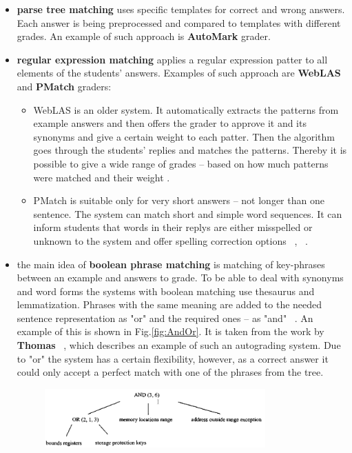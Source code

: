 \documentclass[11pt]{report}
\numberwithin{equation}{section} %
\begin{document}
\begin{itemize}
\item \textbf{parse tree matching} uses specific templates for correct and wrong answers. Each answer is being preprocessed and compared to templates with different grades. An example of such approach is \textbf{AutoMark} grader.
\item \textbf{regular expression matching} applies a regular expression patter to all elements of the students' answers. Examples of such approach are \textbf{WebLAS} and \textbf{PMatch} graders:
\begin{itemize}
\item  WebLAS is an older system. It automatically extracts the patterns from example answers and then offers the grader to approve it and its synonyms and give a certain weight to each patter. Then the algorithm goes through the students' replies and matches the patterns. Thereby it is possible to give a wide range of grades -- based on how much patterns were matched and their weight \cite{Burrows}. 
\item PMatch is suitable only for very short answers -- not longer than one sentence. The system can match short and simple word sequences. It can inform students that words in their replys are either misspelled or unknown to the system and offer spelling correction options ~\cite{Hasanah}, ~\cite{Burrows}.
\end{itemize}
\item the main idea of \textbf{boolean phrase matching} is matching of key-phrases between an example and answers to grade. To be able to deal with synonyms and word forms the systems with boolean matching use thesaurus and lemmatization. Phrases with the same meaning are added to the needed sentence representation as "or" and the required ones -- as "and" ~\cite{Hasanah}. An example of this is shown in Fig.\ref{fig:AndOr}. It is taken from the work by \textbf{Thomas} ~\cite{Thomas}, which describes an example of such an autograding system. Due to "or" the system has a certain flexibility, however, as a correct answer it could only accept a perfect match with one of the phrases from the tree.
\begin{figure}[h!]
  \centering
  \includegraphics[width=0.8\textwidth]{img/AndOr}

\end{figure}
\end{itemize}
\end{document}
